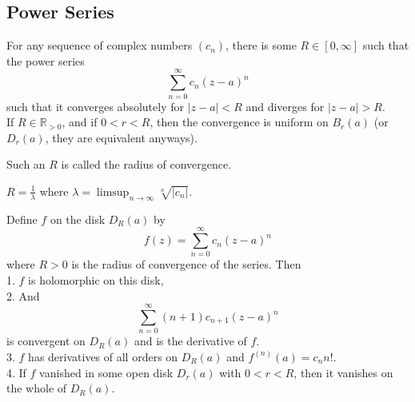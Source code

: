 \subsection{Power Series}
\begin{theorem}
    For any sequence of complex numbers $(c_n)$, there is some $R\in [0,\infty]$ such that the power series
    $$\sum_{n=0}^\infty c_n(z-a)^n$$
    such that it converges absolutely for $|z-a|<R$ and diverges for $|z-a|>R$.\\
    If $R\in\mathbb R_{>0}$, and if $0<r<R$, then the convergence is uniform on $B_r(a)$ (or $D_r(a)$, they are equivalent anyways).
\end{theorem}
\begin{definition}
    Such an $R$ is called the radius of convergence.
\end{definition}
\begin{proposition}
    $R=\frac{1}{\lambda}$ where $\lambda=\limsup_{n\to\infty}\sqrt[n]{|c_n|}$.
\end{proposition}
\begin{theorem}
    Define $f$ on the disk $D_R(a)$ by
    $$f(z)=\sum_{n=0}^\infty c_n(z-a)^n$$
    where $R>0$ is the radius of convergence of the series.
    Then\\
    1. $f$ is holomorphic on this disk,\\
    2. And
    $$\sum_{n=0}^\infty (n+1)c_{n+1}(z-a)^n$$
    is convergent on $D_R(a)$ and is the derivative of $f$.\\
    3. $f$ has derivatives of all orders on $D_R(a)$ and $f^{(n)}(a)=c_nn!$.\\
    4. If $f$ vanished in some open disk $D_r(a)$ with $0<r<R$, then it vanishes on the whole of $D_R(a)$.
\end{theorem}
